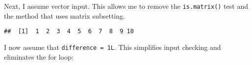 Next, I assume vector input. This allows me to remove the
\texttt{is.matrix()} test and the method that uses matrix subsetting.

\begin{Shaded}
\begin{Highlighting}[]
\StringTok{ }
\StringTok{ }
  \NormalTok{ (}\OperatorTok{>}\StringTok{ }\OperatorTok{||}\StringTok{ }\OperatorTok{>}\StringTok{ }\OperatorTok{||}\StringTok{ }
\StringTok{      }\OperatorTok{<}\StringTok{ }\OperatorTok{||}\StringTok{ }\OperatorTok{<}\StringTok{ }
    \NormalTok{(}\NormalTok{)}

  \OperatorTok{*}\StringTok{ }\OperatorTok{>=}\StringTok{ }
\NormalTok{  \}}

\StringTok{ }\OperatorTok{-}
   
\StringTok{ }\OperatorTok{-}\StringTok{ }\NormalTok{x[}\OperatorTok{-}\OperatorTok{:-}\NormalTok{(}\OperatorTok{-}\StringTok{ }\OperatorTok{+}\StringTok{ }\NormalTok{1L)]}
\NormalTok{  \}}
\NormalTok{\}}
\NormalTok{(}\NormalTok{(}\OperatorTok{:}\NormalTok{))}
\end{Highlighting}
\end{Shaded}

\begin{verbatim}
##  [1]  1  2  3  4  5  6  7  8  9 10
\end{verbatim}

I now assume that \texttt{difference\ =\ 1L}. This simplifies input
checking and eliminates the for loop:

